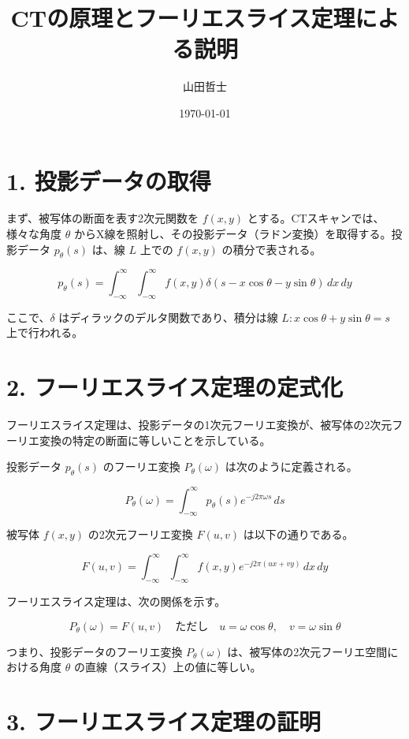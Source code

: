 \documentclass[uplatex]{jsarticle}
\title{CTの原理とフーリエスライス定理による説明}%
\date{\today}%
\author{山田哲士}%
\begin{document}
\maketitle

\section*{1. 投影データの取得}

まず、被写体の断面を表す2次元関数を $f(x, y)$ とする。CTスキャンでは、様々な角度 $\theta$ からX線を照射し、その投影データ（ラドン変換）を取得する。投影データ $p_\theta(s)$ は、線 $L$ 上での $f(x, y)$ の積分で表される。

\[
p_\theta(s) = \int_{-\infty}^{\infty} \int_{-\infty}^{\infty} f(x, y) \delta(s - x\cos\theta - y\sin\theta) \, dx \, dy
\]

ここで、$\delta$ はディラックのデルタ関数であり、積分は線 $L: x\cos\theta + y\sin\theta = s$ 上で行われる。

\section*{2. フーリエスライス定理の定式化}

フーリエスライス定理は、投影データの1次元フーリエ変換が、被写体の2次元フーリエ変換の特定の断面に等しいことを示している。

投影データ $p_\theta(s)$ のフーリエ変換 $P_\theta(\omega)$ は次のように定義される。

\[
P_\theta(\omega) = \int_{-\infty}^{\infty} p_\theta(s) e^{-j2\pi \omega s} \, ds
\]

被写体 $f(x, y)$ の2次元フーリエ変換 $F(u, v)$ は以下の通りである。

\[
F(u, v) = \int_{-\infty}^{\infty} \int_{-\infty}^{\infty} f(x, y) e^{-j2\pi (ux + vy)} \, dx \, dy
\]

フーリエスライス定理は、次の関係を示す。

\[
P_\theta(\omega) = F(u, v) \quad \text{ただし} \quad u = \omega \cos\theta, \quad v = \omega \sin\theta
\]

つまり、投影データのフーリエ変換 $P_\theta(\omega)$ は、被写体の2次元フーリエ空間における角度 $\theta$ の直線（スライス）上の値に等しい。

\section*{3. フーリエスライス定理の証明}
\end{document}
